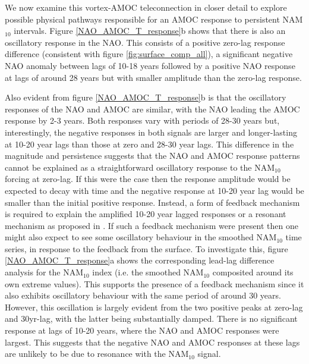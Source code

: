 We now examine this vortex-AMOC teleconnection in closer detail to explore possible physical pathways responsible for an AMOC response to persistent NAM$_{10}$ intervals. Figure \ref{NAO_AMOC_T_response}b shows that there is also an oscillatory response in the NAO. This consists of a positive zero-lag response difference (consistent with figure \ref{fig:surface_comp_all}), a significant negative NAO anomaly between lags of 10-18 years followed by a positive NAO response at lags of around 28 years but with smaller amplitude than the zero-lag response. 

Also evident from figure \ref{NAO_AMOC_T_response}b is that the oscillatory responses of the NAO and AMOC are similar, with the NAO leading the AMOC response by 2-3 years. Both responses vary with periods of 28-30 years but, interestingly, the negative responses in both signals are larger and longer-lasting at 10-20 year lags than those at zero and 28-30 year lags. This difference in the magnitude and persistence suggests that the NAO and AMOC response patterns cannot be explained as a straightforward oscillatory response to the NAM$_{10}$ forcing at zero-lag. If this were the case then the response amplitude would be expected to decay with time and the negative response at 10-20 year lag would be smaller than the initial positive response.  Instead, a form of feedback mechanism is required to explain  the amplified 10-20 year lagged responses or a resonant mechanism as proposed in \cite{reichlerStratospheric2012b}. If such a feedback mechanism were present then one might also expect to see some oscillatory behaviour in the smoothed NAM$_{10}$ time series, in response to the feedback from the surface. To investigate this, figure \ref{NAO_AMOC_T_response}a shows the corresponding lead-lag difference analysis for the NAM$_{10}$ index (i.e. the smoothed NAM$_{10}$ composited around its own extreme values). This supports the presence of a feedback mechanism since it also exhibits oscillatory behaviour with the same period of around 30 years. However, this oscillation is largely evident from the two positive peaks at zero-lag and 30yr-lag, with the latter being substantially damped. There is no significant response at lags of 10-20 years, where the NAO and AMOC responses were largest. This suggests that the negative NAO and AMOC responses at these lags are unlikely to be due to resonance with the NAM$_{10}$ signal. 

